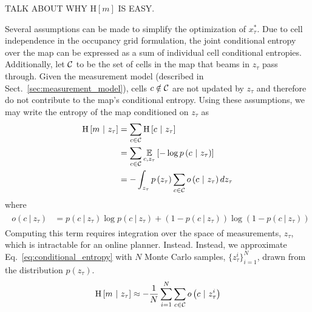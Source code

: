 TALK ABOUT WHY $\text{H}\left[m\right]$ IS EASY.

Several assumptions can be made to simplify the optimization of $x_{\tau}^{*}$. Due to cell independence in the occupancy grid formulation, the joint conditional entropy over the map can be expressed as a sum of individual cell conditional entropies. Additionally, let $\mathcal{C}$ to be the set of cells in the map that beams in $z_{\tau}$ pass through. Given the measurement model (described in Sect.~\ref{sec:measurement_model}), cells $c \notin \mathcal{C}$ are not updated by $z_{\tau}$ and therefore do not contribute to the map's conditional entropy. Using these assumptions, we may write the entropy of the map conditioned on $z_{\tau}$ as
%
\begin{align}
  \begin{split}
    \text{H}
    \left[
      m
      \ \vert \
      z_{\tau}
    \right]
    &=
    \sum_{c \in \mc{C}}
    \text{H}
    \left[
      c
      \ \vert \
      z_{\tau}
    \right]
    \\
    &=
    \sum_{c \in \mc{C}}
    \expect_{c, z_{\tau}}
    \left[
      -\log
      p
      \left(
      c
      \ \vert \
      z_{\tau}
      \right)
    \right]
    \\
    &=
    -
    \int_{z_{\tau}}
    p
    \left(
    z_{\tau}
    \right)
    \sum_{c \in \mc{C}}
    o
    \left(
    c
    \ \vert \
    z_{\tau}
    \right)
    d z_{\tau}
    \label{eq:conditional_entropy}
  \end{split}
\end{align}
%
where
\begin{align}
  \begin{split}
    o(c \ \vert \ z_{\tau})
    &=
    p(c \ \vert \ z_{\tau})
    \log
    p(c \ \vert \ z_{\tau})
    +
    \left(
    1
    -
    p(c \ \vert \ z_{\tau})
    \right)
    \log
    \left(
    1
    -
    p(c \ \vert \ z_{\tau})
    \right)
  \end{split}
\end{align}
%
Computing this term requires integration over the space of measurements, $z_{\tau}$, which is intractable for an online planner. Instead. Instead, we approximate Eq.~\eqref{eq:conditional_entropy} with $N$ Monte Carlo samples, $\{z_{\tau}^{i}\}_{i=1}^{N}$, drawn from the distribution $p(z_{\tau})$.
%
\begin{align}
  \begin{split}
    \text{H}
    \left[
      m
      \ \vert \
      z_{\tau}
    \right]
    &\approx
    -\frac{1}{N}
    \sum_{i=1}^{N}
    \sum_{c \in \mathcal{C}}
    o
    \left(
    c
    \ \vert \
    z_{\tau}^{i}
    \right)
    \\
  \end{split}
\end{align}
